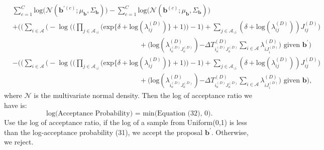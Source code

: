 \documentclass[a4paper]{article}
\begin{document}
   \begin{equation}
   \begin{aligned} 
   &\sum_{c=1}^C\mbox{log}\Big(\mathcal{N}(\boldsymbol{b}^{\prime(c)};\mu_{\boldsymbol{b}}, \Sigma_{\boldsymbol{b}})\Big)-\sum_{c=1}^C\mbox{log}\Big(\mathcal{N}(\boldsymbol{b}^{(c)};\mu_{\boldsymbol{b}}, \Sigma_{\boldsymbol{b}})\Big)\\&+ \Bigg(\Big(\sum_{i\in \mathcal{A}}\Big(-\log\Big(\Big(\prod_{j \in \mathcal{A}_{\backslash i}} \Big(\mbox{exp}\{\delta+\mbox{log}(\lambda_{ij}^{(D)})\} + 1\Big)\Big)-1\Big) + \sum_{j \in \mathcal{A}_{\backslash i}} (\delta+\mbox{log}(\lambda_{ij}^{(D)}))J_{ij}^{(D)}\Big)\\&\quad\quad\quad\quad\quad\quad\quad\quad\quad\quad\quad\quad\quad\quad\quad\quad\quad\quad +  \Big(\mbox{log}(\lambda^{(D)}_{i_o^{(D)}J_o^{(D)}}){ - \Delta T^{(D)}_{i_o^{(D)}J_o^{(D)}}\sum\limits_{i \in \mathcal{A}}\lambda^{(D)}_{i{J_i^{(D)}}}} \Big)\mbox{ given }  \boldsymbol{b}^\prime\Bigg)
   \\& -\Bigg(\Big(\sum_{i\in \mathcal{A}}\Big(-\log\Big(\Big(\prod_{j \in \mathcal{A}_{\backslash i}} \Big(\mbox{exp}\{\delta+\mbox{log}(\lambda_{ij}^{(D)})\} + 1\Big)\Big)-1\Big) + \sum_{j \in \mathcal{A}_{\backslash i}} (\delta+\mbox{log}(\lambda_{ij}^{(D)}))J_{ij}^{(D)}\Big)\\&\quad\quad\quad\quad\quad\quad\quad\quad\quad\quad\quad\quad\quad\quad\quad\quad\quad\quad +  \Big(\mbox{log}(\lambda^{(D)}_{i_o^{(D)}J_o^{(D)}}){ - \Delta T^{(D)}_{i_o^{(D)}J_o^{(D)}}\sum\limits_{i \in \mathcal{A}}\lambda^{(D)}_{i{J_i^{(D)}}}} \Big)\mbox{ given }  \boldsymbol{b}\Bigg),
   \end{aligned}
   \end{equation}
   where $\mathcal{N}$ is the multivariate normal density. Then the log of acceptance ratio we have is:
   \begin{equation}
   \mbox{log(Acceptance Probability) = min(Equation (32), 0). }
   \end{equation}
   Use the log of acceptance ratio, if the log of a sample from Uniform(0,1) is less than the log-acceptance probability (31), we accept the proposal $\boldsymbol{b}^\prime$. Otherwise, we reject.
\end{document}
